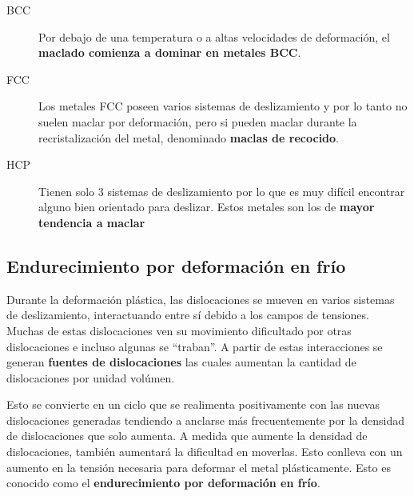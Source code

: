 \begin{description}
	\item[BCC] Por debajo de una temperatura o a altas velocidades de deformación, el \textbf{maclado comienza a dominar en metales BCC}. 
	\item[FCC] Los metales FCC poseen varios sistemas de deslizamiento y por lo tanto no suelen maclar por deformación, pero si pueden maclar durante la recristalización del metal, denominado \textbf{maclas de recocido}.
	\item[HCP] Tienen solo 3 sistemas de deslizamiento por lo que es muy difícil encontrar alguno bien orientado para deslizar. Estos metales son los de \textbf{mayor tendencia a maclar}
\end{description}


\subsection{Endurecimiento por deformación en frío}

Durante la deformación plástica, las dislocaciones se mueven en varios sistemas de deslizamiento, interactuando entre sí debido a los campos de tensiones. Muchas de estas dislocaciones ven su movimiento dificultado por otras dislocaciones e incluso algunas se ``traban''. A partir de estas interacciones se generan \textbf{fuentes de dislocaciones} las cuales aumentan la cantidad de dislocaciones por unidad volúmen. 

Esto se convierte en un ciclo que se realimenta positivamente con las nuevas dislocaciones generadas tendiendo a anclarse más frecuentemente por la densidad de dislocaciones que solo aumenta. A medida que aumente la densidad de dislocaciones, también aumentará la dificultad en moverlas. Esto conlleva con un aumento en la tensión necesaria para deformar el metal plásticamente. Esto es conocido como el \textbf{endurecimiento por deformación en frío}.

